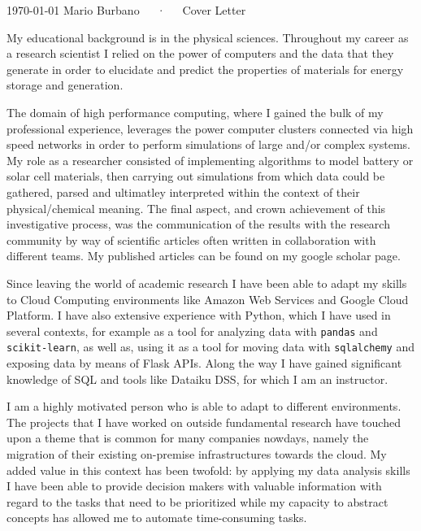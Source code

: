 \documentclass[11pt, a4paper]{awesome-cv}
\begin{document}
\makecvheader[R]

\makecvfooter
  {\today}
  {Mario Burbano~~~·~~~Cover Letter}
  {}

\makelettertitle

\begin{cvletter}


My educational background is in the physical sciences. Throughout my career as a research scientist I relied on the power of computers and the data that they generate in order to elucidate and predict the properties of materials for energy storage and generation.

The domain of high performance computing, where I gained the bulk of my professional experience, leverages the power computer clusters connected via high speed networks in order to perform simulations of large and/or complex systems. My role as a researcher consisted of implementing algorithms to model battery or solar cell materials, then carrying out simulations from which data could be gathered, parsed and ultimatley interpreted within the context of their physical/chemical meaning. The final aspect, and crown achievement of this investigative process, was the communication of the results with the research community by way of scientific articles often written in collaboration with different teams. My published articles can be found on my google scholar page.

Since leaving the world of academic research I have been able to adapt my skills to Cloud Computing environments like Amazon Web Services and Google Cloud Platform. I have also extensive experience with Python, which I have used in several contexts, for example as a tool for analyzing data with \texttt{pandas} and \texttt{scikit-learn}, as well as, using it as a tool for moving data with \texttt{sqlalchemy} and exposing data by means of Flask APIs. Along the way I have gained significant knowledge of SQL and tools like Dataiku DSS, for which I am an instructor.

I am a highly motivated person who is able to adapt to different environments. The projects that I have worked on outside fundamental research have touched upon a theme that is common for many companies nowdays, namely the migration of their existing on-premise infrastructures towards the cloud. My added value in this context has been twofold: by applying my data analysis skills I have been able to provide decision makers with valuable information with regard to the tasks that need to be prioritized while my capacity to abstract concepts has allowed me to automate time-consuming tasks.


\end{cvletter}
\end{document}

